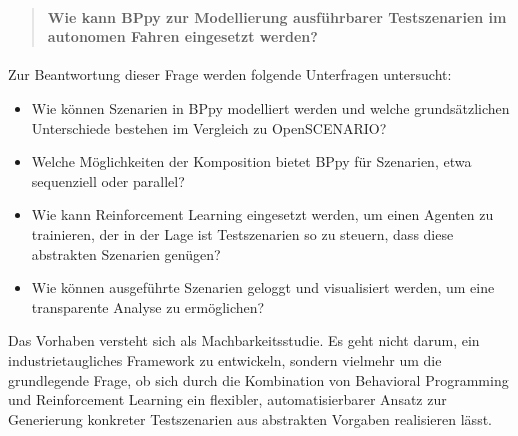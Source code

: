 \begin{quote}
\paragraph{Wie kann BPpy zur Modellierung ausführbarer Testszenarien im autonomen Fahren eingesetzt werden?}
\end{quote}

Zur Beantwortung dieser Frage werden folgende Unterfragen untersucht:
\begin{itemize}
    \item Wie können Szenarien in BPpy modelliert werden und welche grundsätzlichen Unterschiede bestehen im Vergleich zu OpenSCENARIO?
    \item Welche Möglichkeiten der Komposition bietet BPpy für Szenarien, etwa sequenziell oder parallel?
    \item Wie kann Reinforcement Learning eingesetzt werden, um einen Agenten zu trainieren, der in der Lage ist Testszenarien so zu steuern, dass diese abstrakten Szenarien genügen?
    \item Wie können ausgeführte Szenarien geloggt und visualisiert werden, um eine transparente Analyse zu ermöglichen?
\end{itemize}

Das Vorhaben versteht sich als Machbarkeitsstudie. Es geht nicht darum, ein industrietaugliches Framework zu entwickeln, sondern vielmehr um die grundlegende Frage, ob sich durch die Kombination von Behavioral Programming und Reinforcement Learning ein flexibler, automatisierbarer Ansatz zur Generierung konkreter Testszenarien aus abstrakten Vorgaben realisieren lässt.